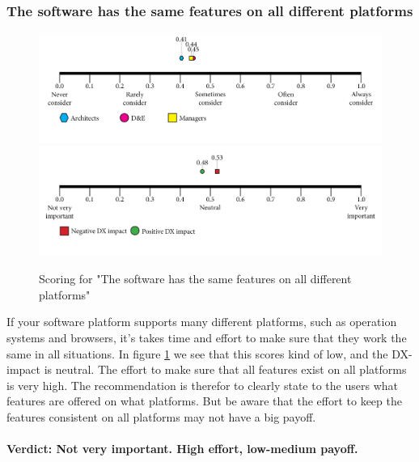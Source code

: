 \documentclass{article}
\begin{document}
\subsubsection{The software has the same features on all different platforms}
\begin{figure}[H]
\centering
\includegraphics[width=\linewidth]{scorelines/aspect11.png}
\includegraphics[width=\linewidth]{dxscorelines/dxaspect11.png}
\caption{Scoring for "The software has the same features on all different platforms"}
\label{fig:aspect11}
\end{figure}
If your software platform supports many different platforms, such as operation systems and browsers, it's takes time and effort to make sure that they work the same in all situations. In figure \ref{fig:aspect11} we see that this scores kind of low, and the DX-impact is neutral. The effort to make sure that all features exist on all platforms is very high. The recommendation is therefor to clearly state to the users what features are offered on what platforms. But be aware that the effort to keep the features consistent on all platforms may not have a big payoff. \\ \\
\textbf{Verdict: Not very important. High effort, low-medium payoff.}
\end{document}
